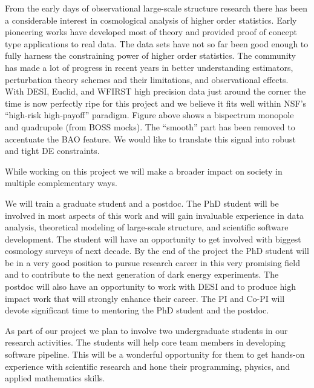 From the early days of observational large-scale structure research
there has been a considerable interest in cosmological analysis of higher order statistics.
Early pioneering works have developed most of theory and provided proof of concept
type applications to real data. The data sets have not so far been good enough
to fully harness the constraining power of higher order statistics. 
The community has made a lot of progress in recent years in better
understanding estimators, perturbation theory schemes and their limitations,
and observational effects. With DESI, Euclid, and WFIRST high precision data
just around the corner the time is now perfectly ripe for this project and we
believe it fits well within NSF's ``high-risk high-payoff'' paradigm. Figure
above shows a bispectrum monopole and quadrupole (from BOSS mocks). The
``smooth'' part has been removed to accentuate the BAO feature. We would like
to translate this signal into robust and tight DE constraints.

\newpage


While working on this project we will make a broader impact on society in
multiple complementary ways.

We will train a graduate student and a postdoc. The PhD student will be
involved in most aspects of this work and will gain invaluable experience in
data analysis, theoretical modeling of large-scale structure, and scientific
software development. The student will have an opportunity to get involved with
biggest cosmology surveys of next decade. By the end of the project the PhD
student will be in a very good position to pursue research career in this
very promising field and to contribute to the next generation of dark
energy experiments. The postdoc will also have an opportunity to work with DESI
and to produce high impact work that will strongly enhance their career. The
PI and Co-PI will devote significant time to mentoring the PhD student and
the postdoc.

As part of our project we plan to involve two undergraduate students in our
research activities. The students will help core team members in developing
software pipeline. This will be a wonderful opportunity for them to get
hands-on experience with scientific research and hone their programming,
physics, and applied mathematics skills. 

